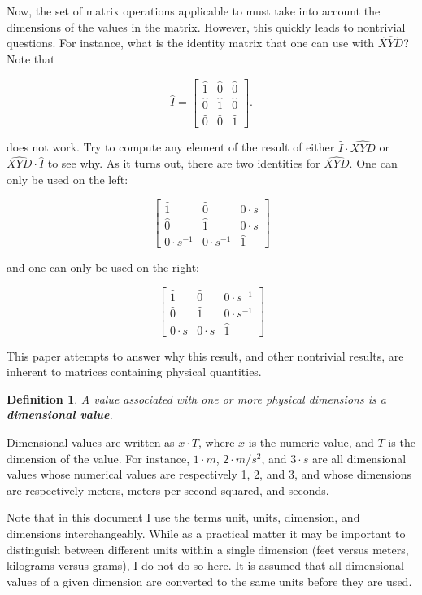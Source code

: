\documentclass[10pt,letterpaper]{article}
\newtheorem{defn}{Definition}[section]
\numberwithin{equation}{section}
\begin{document}
Now, the set of matrix operations applicable to must take into account
the dimensions of the values in the matrix.  However, this quickly
leads to nontrivial questions.  For instance, what is the identity
matrix that one can use with $\widehat{XYD}$?  Note that

\[ \hat I = \left[ \begin{matrix} 
  \hat 1 & \hat 0 & \hat 0 \\
  \hat 0 & \hat 1 & \hat 0 \\
  \hat 0 & \hat 0 & \hat 1
 \end{matrix} \right]. \]
 
does not work.  Try to compute any element of the result of either
$\hat I \cdot \widehat{XYD}$ or $\widehat{XYD} \cdot \hat I$ to see
why.  As it turns out, there are two identities for $\widehat{XYD}$.
One can only be used on the left:
 
 \[ \left[ \begin{matrix} 
  \hat 1 & \hat 0 & 0 \cdot s \\
  \hat 0 & \hat 1 & 0 \cdot s \\
  0 \cdot s^{-1} & 0 \cdot s^{-1} & \hat 1
 \end{matrix} \right] \]

and one can only be used on the right:

\[ \left[ \begin{matrix} 
  \hat 1 & \hat 0 & 0 \cdot s^{-1} \\
  \hat 0 & \hat 1 & 0 \cdot s^{-1} \\
  0 \cdot s & 0 \cdot s & \hat 1
 \end{matrix} \right] \]
 
This paper attempts to answer why this result, and other nontrivial
results, are inherent to matrices containing physical quantities.

\begin{defn} A value associated with one or more physical dimensions
  is a \textbf{dimensional value}. \end{defn}

Dimensional values are written as $x \cdot T$, where $x$ is the
numeric value, and $T$ is the dimension of the value.  For instance,
$1 \cdot m$, $2 \cdot m/s^2$, and $3 \cdot s$ are all dimensional
values whose numerical values are respectively 1, 2, and 3, and whose
dimensions are respectively meters, meters-per-second-squared, and
seconds.
 
Note that in this document I use the terms unit, units, dimension, and
dimensions interchangeably.  While as a practical matter it may be
important to distinguish between different units within a single
dimension (feet versus meters, kilograms versus grams), I do not do so
here.  It is assumed that all dimensional values of a given dimension
are converted to the same units before they are used.
 
\end{document}
